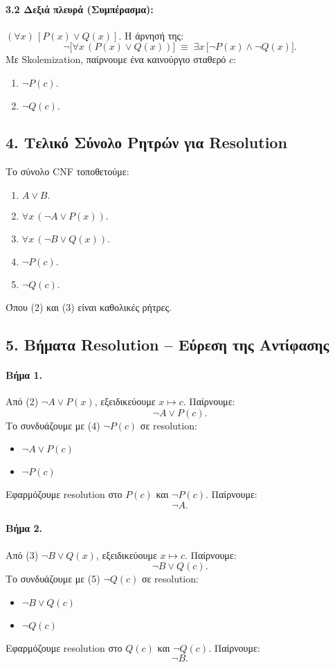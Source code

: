 \documentclass[a4paper,12pt]{article}
\begin{document}
\paragraph{3.2 Δεξιά πλευρά (Συμπέρασμα):}
$(\forall x)\,[P(x) \lor Q(x)].$
Η άρνησή της:
\[
\neg \bigl[\forall x\,(P(x) \lor Q(x))\bigr] \;\equiv\; \exists x\,\bigl[\neg P(x) \land \neg Q(x)\bigr].
\]
Με Skolemization, παίρνουμε ένα καινούργιο σταθερό $c$:
\begin{enumerate}
    \item $\neg P(c).$
    \item $\neg Q(c).$
\end{enumerate}

\subsection*{4. Τελικό Σύνολο Ρητρών για Resolution}
Το σύνολο CNF τοποθετούμε:
\begin{enumerate}
    \item $A \lor B.$
    \item $\forall x\,(\neg A \lor P(x)).$
    \item $\forall x\,(\neg B \lor Q(x)).$
    \item $\neg P(c).$
    \item $\neg Q(c).$
\end{enumerate}
Όπου (2) και (3) είναι καθολικές ρήτρες.

\subsection*{5. Βήματα Resolution – Εύρεση της Αντίφασης}
\paragraph{Βήμα 1.}
Από (2) $\neg A \lor P(x)$, εξειδικεύουμε $x \mapsto c$. Παίρνουμε:
\[
\neg A \lor P(c).
\]
Το συνδυάζουμε με (4) $\neg P(c)$ σε resolution:
\begin{itemize}
    \item $\neg A \lor P(c)$
    \item $\neg P(c)$
\end{itemize}
Εφαρμόζουμε resolution στο $P(c)$ και $\neg P(c)$. Παίρνουμε:
\[
\neg A.
\]

\paragraph{Βήμα 2.}
Από (3) $\neg B \lor Q(x)$, εξειδικεύουμε $x \mapsto c$. Παίρνουμε:
\[
\neg B \lor Q(c).
\]
Το συνδυάζουμε με (5) $\neg Q(c)$ σε resolution:
\begin{itemize}
    \item $\neg B \lor Q(c)$
    \item $\neg Q(c)$
\end{itemize}
Εφαρμόζουμε resolution στο $Q(c)$ και $\neg Q(c)$. Παίρνουμε:
\[
\neg B.
\]
\end{document}
